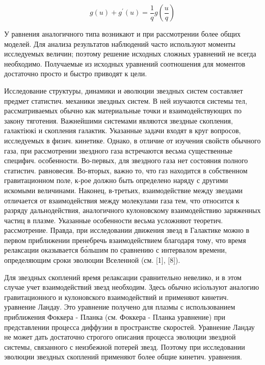 \documentclass[10pt]{article}
\begin{document}
\[

g(u)+g^{\prime}(u)=\frac{1}{q} g\left(\frac{u}{q}\right)

\]



У равнения аналогичного типа возникают и при рассмотрении более общих моделей. Для анализа результатов наблюдений часто используют моменты исследуемых величин; поэтому решение исходных сложных уравнений не всегда необходимо. Получаемые из исходных уравнений соотношения для моментов достаточно просто и быстро приводят к цели.



Исследование структуры, динамики и әволюции звездных систем составляет предмет статистич. механики звездных систем. В ней изучаются системы тел, рассматриваемых обычно как материальные точки и взаимодействующих по закону тяготения. Важнейшими системами являются звездные скопления, галактіюкі и скопления галактик. Указанные задачи входят в круг вопросов, исследуемых в физич. кинетике. Однако, в отличие от изучения свойств обычного газа, при рассмотрении звездного газа встречаются весьма существенные специфич. особенности. Во-первых, для звездного газа нет состояния полного статистич. равновесия. Во-вторых, важно то, что газ находится в собственном гравитационном поле, к-рое должно быть определено наряду с другими искомыми величинами. Наконец, в-третьих, взаимодействие между звездами отличается от взаимодействия между молекулами газа тем, что относится к разряду дальнодействия, аналогичного кулоновскому взаимодействию заряженных частиц в плазме. Указанные особенности весьма усложняют теоретич. рассмотрение. Правда, при исследовании движения звезд в Галактике можно в первом приближении пренебречь взаимодействием благодаря тому, что время релаксации оказывается бо́льшим по сравнению с интервалом времени, определяющим сроки эволюции Вселенной (см. [1], [8]).



Для звездных скоплений время релаксации сравнительно невелико, и в этом случае учет взаимодействий звезд необходим. Здесь обычно исіользуют аналогию гравитационного и кулоновского взаимодействий и применяют кинетич. уравнение Ландау. Это уравнение получено для плазмы с использованием приближения Фоккера - Планка (см. Фоккера - Планка уравнение) при представлении процесса диффузии в пространстве скоростей. Уравнение Ландау не может дать достаточно строгого описания процесса эволюции звездной системы, связанного с неизбежной потерей звезд. Поэтому при исследовании эволюции звездных скоплений применяют более общие кинетич. уравнения.
\end{document}
